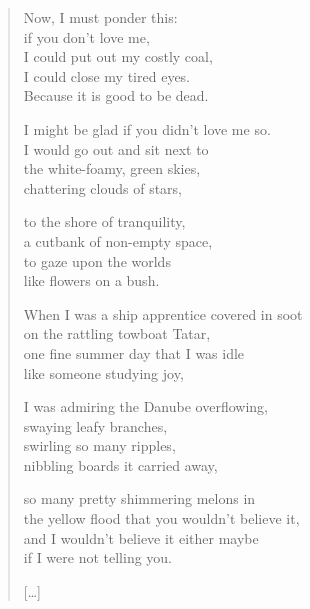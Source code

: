 \documentclass[11pt]{extbook}
\newcommand*{\centeredornament}{\centerline{\pgfornament[width=6cm]{88}}}
\begin{document}
\newpage


\vspace*{-15mm}
\centeredornament



\begin{verse}
  Now, I must ponder this: \\
  if you don't love me, \\
  I could put out my costly coal, \\
  I could close my tired eyes. \\
  Because it is good to be dead.

  I might be glad if you didn't love me so. \\
  I would go out and sit next to \\
  the white-foamy, green skies, \\
  chattering clouds of stars,

  to the shore of tranquility, \\
  a cutbank of non-empty space, \\
  to gaze upon the worlds \\
  like flowers on a bush.

  When I was a ship apprentice covered in soot\hspace*{-1mm} \\
  on the rattling towboat Tatar,\hspace*{-1mm} \\
  one fine summer day that I was idle \\
  like someone studying joy,

  I was admiring the Danube overflowing, \\
  swaying leafy branches, \\
  swirling so many ripples, \\
  nibbling boards it carried away,

  so many pretty shimmering melons in \\
  the yellow flood that you wouldn't believe it, \\
  and I wouldn't believe it either maybe \\
  if I were not telling you.

  \hfill [\ldots]
\end{verse}

\newpage
\end{document}
